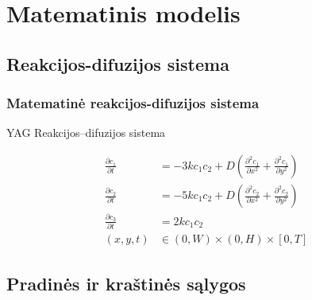 \documentclass{beamer}
\begin{document}
\section{Matematinis modelis}


\subsection{Reakcijos-difuzijos sistema}

\begin{frame}
\frametitle{Matematinė reakcijos-difuzijos sistema}

YAG Reakcijos--difuzijos sistema

\begin{align*}
    \frac{\partial c_1}{\partial t} & =-3kc_1c_2+D\left(\frac{\partial^2c_1}{\partial x^2}+\frac{\partial^2c_1}{\partial y^2}\right) \\
    \frac{\partial c_2}{\partial t} & =-5kc_1c_2+D\left(\frac{\partial^2c_2}{\partial x^2}+\frac{\partial^2c_2}{\partial y^2}\right)\\
    \frac{\partial c_3}{\partial t} & =2kc_1c_2\\
    (x, y, t)&\in(0, W)\times(0, H)\times[0, T]
\end{align*}

\end{frame}

\subsection{Pradinės ir kraštinės sąlygos}
\end{document}
